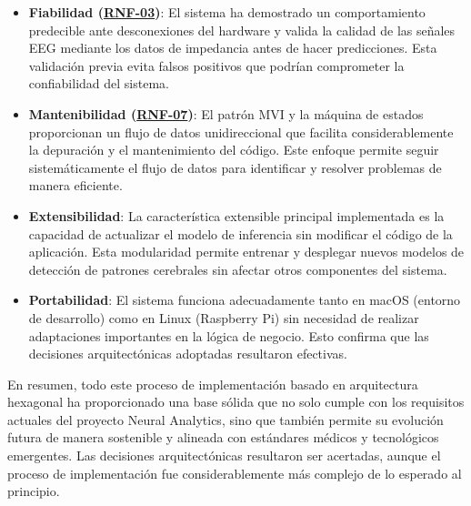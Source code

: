\begin{itemize}
    \item \textbf{Fiabilidad (\hyperref[rnf-03]{RNF-03})}: El sistema ha demostrado un comportamiento predecible ante desconexiones del hardware y valida la calidad de las señales EEG mediante los datos de impedancia antes de hacer predicciones. Esta validación previa evita falsos positivos que podrían comprometer la confiabilidad del sistema.
    
    \item \textbf{Mantenibilidad (\hyperref[rnf-07]{RNF-07})}: El patrón MVI y la máquina de estados proporcionan un flujo de datos unidireccional que facilita considerablemente la depuración y el mantenimiento del código. Este enfoque permite seguir sistemáticamente el flujo de datos para identificar y resolver problemas de manera eficiente.
    
    \item \textbf{Extensibilidad}: La característica extensible principal implementada es la capacidad de actualizar el modelo de inferencia sin modificar el código de la aplicación. Esta modularidad permite entrenar y desplegar nuevos modelos de detección de patrones cerebrales sin afectar otros componentes del sistema.
    
    \item \textbf{Portabilidad}: El sistema funciona adecuadamente tanto en macOS (entorno de desarrollo) como en Linux (Raspberry Pi) sin necesidad de realizar adaptaciones importantes en la lógica de negocio. Esto confirma que las decisiones arquitectónicas adoptadas resultaron efectivas.
\end{itemize}

En resumen, todo este proceso de implementación basado en arquitectura hexagonal ha proporcionado una base sólida que no solo cumple con los requisitos actuales del proyecto Neural Analytics, sino que también permite su evolución futura de manera sostenible y alineada con estándares médicos y tecnológicos emergentes. Las decisiones arquitectónicas resultaron ser acertadas, aunque el proceso de implementación fue considerablemente más complejo de lo esperado al principio.
